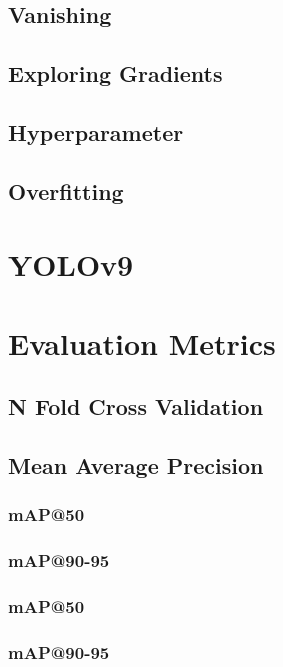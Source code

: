 \subsection{Vanishing}
\subsection{Exploring Gradients}
\subsection{Hyperparameter}
\subsection{Overfitting}







\section{YOLOv9}

\section{Evaluation Metrics}
\subsection{N Fold Cross Validation}
\subsection{Mean Average Precision}
\subsubsection{mAP@50}
\subsubsection{mAP@90-95}

\subsubsection{mAP@50}
\subsubsection{mAP@90-95}


